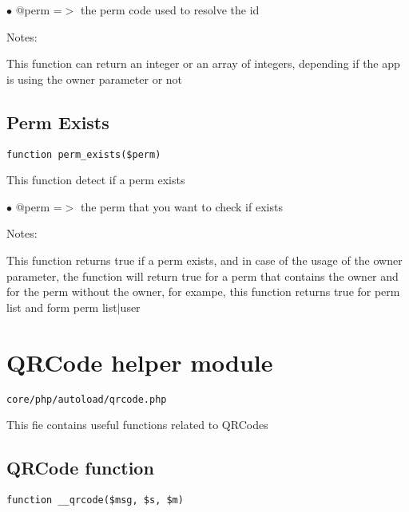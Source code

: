 \documentclass[a4paper]{book}
\begin{document}
\begin{compactitem}
\item[\color{myblue}$\bullet$] @perm =$>$ the perm code used to resolve the id
\end{compactitem}

Notes:

This function can return an integer or an array of integers, depending
if the app is using the owner parameter or not

\hypertarget{toc209}{}
\subsection{Perm Exists}

\begin{lstlisting}
function perm_exists($perm)
\end{lstlisting}

This function detect if a perm exists

\begin{compactitem}
\item[\color{myblue}$\bullet$] @perm =$>$ the perm that you want to check if exists
\end{compactitem}

Notes:

This function returns true if a perm exists, and in case of the usage
of the owner parameter, the function will return true for a perm that
contains the owner and for the perm without the owner, for exampe, this
function returns true for perm list and form perm list$|$user

\hypertarget{toc210}{}
\section{QRCode helper module}

\begin{lstlisting}
core/php/autoload/qrcode.php
\end{lstlisting}

This fie contains useful functions related to QRCodes

\hypertarget{toc211}{}
\subsection{QRCode function}

\begin{lstlisting}
function __qrcode($msg, $s, $m)
\end{lstlisting}
\end{document}
